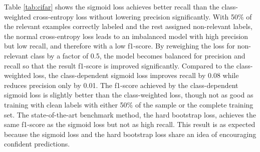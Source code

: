 Table \ref{tab:cifar} shows the sigmoid loss achieves better recall than the class-weighted cross-entropy loss without lowering precision significantly.
With 50\% of the relevant examples correctly labeled and the rest assigned non-relevant labels, the normal cross-entropy loss leads to an imbalanced model with high precision but low recall, and therefore with a low f1-score.
By reweighing the loss for non-relevant class by a factor of 0.5, the model becomes balanced for precision and recall so that the result f1-score is improved significantly.
Compared to the class-weighted loss, the class-dependent sigmoid loss improves recall by 0.08 while reduces precision only by 0.01.
The f1-score achieved by the class-dependent sigmoid loss is slightly better than the class-weighted loss, though not as good as training with clean labels with either 50\% of the sample or the complete training set.
The state-of-the-art benchmark method, the hard bootstrap loss, achieves the same f1-score as the sigmoid loss but not as high recall.
This result is as expected because the sigmoid loss and the hard bootstrap loss share an idea of encouraging confident predictions.



